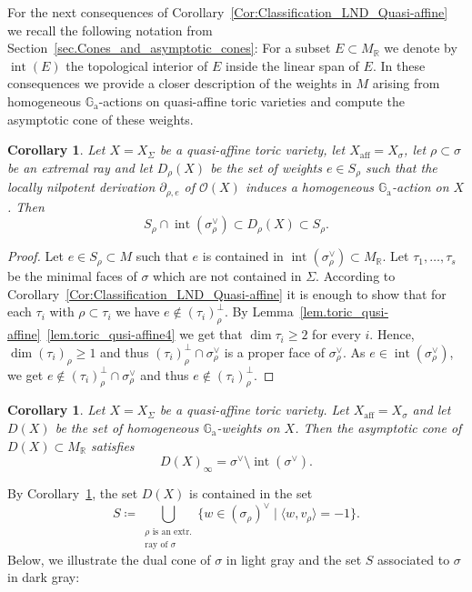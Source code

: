 \documentclass[11pt]{article}
\numberwithin{equation}{section}
\let\mathcal\mathscr
\newcommand{\ra}{\mathrm{a}}
\let\oldvee\vee
\renewcommand{\vee}{{\scriptscriptstyle\oldvee}}
\let\oldbot\bot
\renewcommand{\bot}{{\scriptscriptstyle\oldbot}}
\theoremstyle{plain}
\newtheorem{corollary}[theorem]{Corollary}
\theoremstyle{definition}
\DeclareMathOperator{\aff}{aff}
\DeclareMathOperator{\inter}{int}
\newcommand{\OO}{\mathcal{O}}
\newcommand{\GG}{\mathbb{G}}
\newcommand{\RR}{\mathbb{R}}
\newcommand{\set}[2]{\{#1 \mid #2\}}
\newcommand{\sprod}[2]{\langle #1, #2 \rangle}
\begin{document}
For the next consequences of Corollary~\ref{Cor:Classification_LND_Quasi-affine} we recall the
following notation from Section~\ref{sec.Cones_and_asymptotic_cones}: For a
subset $E \subset M_{\RR}$ we denote by $\inter(E)$ the topological interior of $E$
inside the linear span of $E$. In these consequences we provide a closer
description of the weights in $M$ arising from homogeneous $\GG_\ra$-actions on quasi-affine toric varieties
and compute the asymptotic cone of these weights.

\begin{corollary}
\label{cor.Weights_rho}
Let $X = X_{\Sigma}$ be a quasi-affine toric variety, let $X_{\aff}=X_{\sigma}$, let
$\rho \subset \sigma$ be an extremal ray and let $D_{\rho}(X)$
be the set of weights $e \in S_\rho$ such that the locally nilpotent derivation
$\partial_{\rho, e}$ of $\OO(X)$ induces a homogeneous $\GG_\ra$-action on $X$. Then
\[
S_{\rho} \cap \inter(\sigma_{\rho}^\vee) \subset
D_{\rho}(X) \subset S_\rho.
\]
\end{corollary}

\begin{proof}
Let $e \in S_{\rho} \subset M$ such that $e$ is contained in
$\inter(\sigma_{\rho}^\vee) \subset M_{\RR}$.
Let $\tau_1, \ldots, \tau_s$ be the minimal faces of $\sigma$ which are not contained in $\Sigma$.
According to Corollary~\ref{Cor:Classification_LND_Quasi-affine} it is enough to show that for each $\tau_i$
with $\rho \subset \tau_i$ we have $e \not\in (\tau_i)_{\rho}^\bot$. By
Lemma~\ref{lem.toric_qusi-affine}~\eqref{lem.toric_qusi-affine4} we get that $\dim \tau_i \geq 2$
for every $i$. Hence, $\dim (\tau_i)_\rho \geq 1$
and thus $(\tau_i)_\rho^\bot \cap \sigma_\rho^\vee$ is a proper face of $\sigma_\rho^\vee$. As
$e \in \inter(\sigma_\rho^\vee)$, we get
$e \not\in (\tau_i)_\rho^\bot \cap \sigma_\rho^\vee$ and thus $e \not\in (\tau_i)_\rho^\bot$.
\end{proof}

\begin{corollary}
\label{cor.Weights}
Let $X = X_\Sigma$ be a quasi-affine toric variety. Let $X_{\aff} = X_{\sigma}$
and let $D(X)$ be the set of homogeneous $\GG_\ra$-weights on $X$.
Then the asymptotic cone of
$D(X) \subset M_{\RR}$ satisfies
\[
D(X)_{\infty} = \sigma^\vee \setminus \inter(\sigma^\vee).
\]
\end{corollary}

By Corollary~\ref{cor.Weights_rho}, the set $D(X)$ is contained in
the set
\[
S \coloneqq \bigcup_{\substack{
\textrm{$\rho$ is an extr.} \\
\textrm{ray of $\sigma$}
}} \set{w \in (\sigma_\rho)^\vee}{\sprod{w}{v_\rho} = -1}.
\]
Below, we illustrate the dual cone of $\sigma$ in light gray
and the set $S$ associated to $\sigma$ in dark gray:
\end{document}
